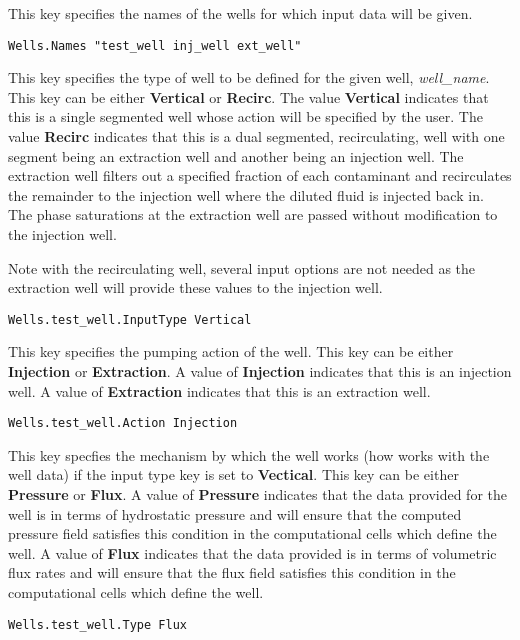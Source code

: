 {
This key specifies the names of the wells for which input data will be
given.
}
\begin{display}\begin{verbatim}
Wells.Names "test_well inj_well ext_well"
\end{verbatim}\end{display}

{
This key specifies the type of well to be defined for the given well,
{\em well\_name}.  This key can be either {\bf Vertical} or
{\bf Recirc}.  The value {\bf Vertical} indicates that this is a
single segmented well whose action will be specified by the user.
The value {\bf Recirc} indicates that this is a dual segmented,
recirculating, well with one segment being an extraction well and
another being an injection well.  The extraction well filters out a
specified fraction of each contaminant and recirculates the remainder
to the injection well where the diluted fluid is injected back in.  The
phase saturations at the extraction well are passed without modification
to the injection well.

Note with the recirculating well, several input options are not needed
as the extraction well will provide these values to the injection well.
}
\begin{display}\begin{verbatim}
Wells.test_well.InputType Vertical
\end{verbatim}\end{display}

{
This key specifies the pumping action of the well.  This key can be
either {\bf Injection} or {\bf Extraction}.  A value of {\bf Injection}
indicates that this is an injection well.  A value of {\bf Extraction}
indicates that this is an extraction well.
}
\begin{display}\begin{verbatim}
Wells.test_well.Action Injection
\end{verbatim}\end{display}

{
This key specfies the mechanism by which the well works (how \parflow{}
works with the well data) if the input type key is set to {\bf Vectical}.
This key can be either {\bf Pressure} or {\bf Flux}.  A value of
{\bf Pressure} indicates that the data provided for the well is in terms
of hydrostatic pressure and \parflow{} will ensure that the computed
pressure field satisfies this condition in the computational cells which
define the well.  A value of {\bf Flux} indicates that the data provided
is in terms of volumetric flux rates and \parflow{} will ensure that the
flux field satisfies this condition in the computational cells which
define the well.
}
\begin{display}\begin{verbatim}
Wells.test_well.Type Flux
\end{verbatim}\end{display}

